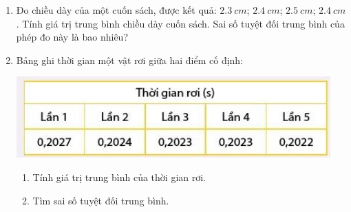 \begin{enumerate}[label=\bfseries Bài \arabic*:]
{}
	
	\item {}
	
	{
		Đo chiều dày của một cuốn sách, được kết quả: $\SI{2,3}{cm}$; $\SI{2,4}{cm}$; $\SI{2,5}{cm}$; $\SI{2,4}{cm}$. Tính giá trị trung bình chiều dày cuốn sách. Sai số tuyệt đối trung bình của phép đo này là bao nhiêu?
	}
	
	
	\item {}
	
	{
		
		Bảng ghi thời gian một vật rơi giữa hai điểm cố định:
		
		\begin{center}
			\includegraphics[scale=1]{../figs/VN10-2022-PH-TP003-1.jpg}
		\end{center}
		\begin{enumerate}[label=\alph*)]
			\item Tính giá trị trung bình của thời gian rơi.
			\item Tìm sai số tuyệt đối trung bình.
		\end{enumerate}
	}
	

\end{enumerate}
